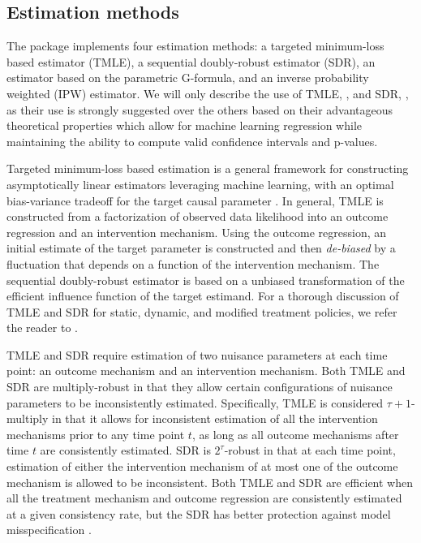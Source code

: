 \documentclass[]{jss}
\begin{document}
\hypertarget{estimation-methods}{%
\subsection{Estimation methods}\label{estimation-methods}}

The  package implements four estimation methods: a targeted
minimum-loss based estimator (TMLE), a sequential doubly-robust
estimator (SDR), an estimator based on the parametric G-formula, and an inverse
probability weighted (IPW) estimator. We will only describe the use of
TMLE, , and SDR, , as
their use is strongly suggested over the others based on their
advantageous theoretical properties which allow for machine learning
regression while maintaining the ability to compute valid confidence
intervals and p-values.

Targeted minimum-loss based estimation is a general framework for
constructing asymptotically linear estimators leveraging machine
learning, with an optimal bias-variance tradeoff for the target causal
parameter \citep{vanderLaanRose11, vanderLaanRose18}. In general, TMLE
is constructed from a factorization of observed data likelihood into
an outcome regression and an intervention mechanism. Using the outcome
regression, an initial estimate of the target parameter is constructed
and then \textit{de-biased} by a fluctuation that depends on a
function of the intervention mechanism. The sequential doubly-robust
estimator is based on a unbiased transformation of the efficient
influence function of the target estimand. For a thorough discussion
of TMLE and SDR for static, dynamic, and modified treatment policies,
we refer the reader to
\cite{van2011targeted,luedtke2017sequential,rotnitzky2017multiply,
  diazNonparametricCausalEffects2020a}.

TMLE and SDR require estimation of two nuisance parameters at each
time point: an outcome mechanism and an intervention mechanism. Both
TMLE and SDR are multiply-robust in that they allow certain
configurations of nuisance parameters to be inconsistently
estimated. Specifically, TMLE is considered \(\tau + 1\)-multiply in
that it allows for inconsistent estimation of all the intervention
mechanisms prior to any time point $t$, as long as all outcome
mechanisms after time $t$ are consistently estimated. SDR is
\(2^{\tau}\)-robust in that at each time point, estimation of either
the intervention mechanism of at most one of the outcome mechanism is
allowed to be inconsistent. Both TMLE and SDR are efficient when all
the treatment mechanism and outcome regression are consistently
estimated at a given consistency rate, but the SDR has better
protection against model misspecification \citep[see][for more details]{luedtke2017sequential,rotnitzky2017multiply,
  diazNonparametricCausalEffects2020a}.
\end{document}

